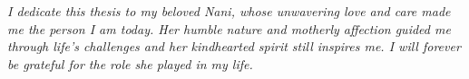 \begin{center}
\vfill
    \textit{
    I dedicate this thesis to my beloved \textsf{Nani}, whose unwavering love and care made me the person I am today. Her humble nature and motherly affection guided me through life's challenges and her kindhearted spirit still inspires me. I will forever be grateful for the role she played in my life. 
    }
    \vfill
\end{center}
